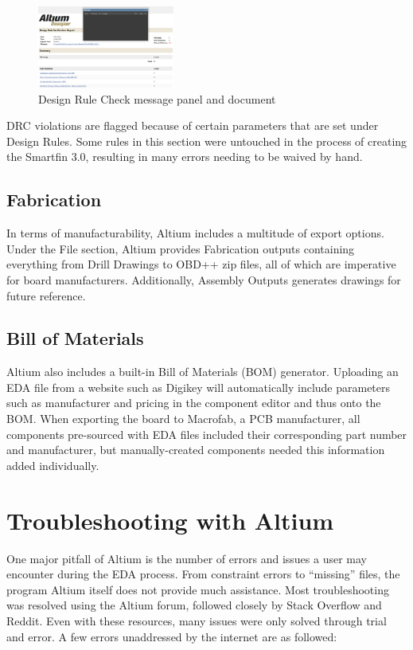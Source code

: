 \documentclass[twocolumn]{article}
\begin{document}
\begin{figure}[h]
    \centering
    \includegraphics[width=0.4\textwidth]{DRC.png}
    \caption{Design Rule Check message panel and document}
    \label{fig:DRC}
\end{figure}

DRC violations are flagged because of certain parameters that are set under Design Rules. Some rules in this section were untouched in the process of creating the Smartfin 3.0, resulting in many errors needing to be waived by hand. 

\subsection{Fabrication}
In terms of manufacturability, Altium includes a multitude of export options. Under the File section, Altium provides Fabrication outputs containing everything from Drill Drawings to OBD++ zip files, all of which are imperative for board manufacturers. Additionally, Assembly Outputs generates drawings for future reference.

\subsection{Bill of Materials}
Altium also includes a built-in Bill of Materials (BOM) generator. Uploading an EDA file from a website such as Digikey will automatically include parameters such as manufacturer and pricing in the component editor and thus onto the BOM. When exporting the board to Macrofab\cite{Macrofab}, a PCB manufacturer, all components pre-sourced with EDA files included their corresponding part number and manufacturer, but manually-created components needed this information added individually. 

\section{Troubleshooting with Altium}

One major pitfall of Altium is the number of errors and issues a user may encounter during the EDA process. From constraint errors to “missing” files, the program Altium itself does not provide much assistance. Most troubleshooting was resolved using the Altium forum\cite{Altium}, followed closely by Stack Overflow\cite{StackOverflow} and Reddit\cite{Reddit}. Even with these resources, many issues were only solved through trial and error. A few errors unaddressed by the internet are as followed:
\end{document}
